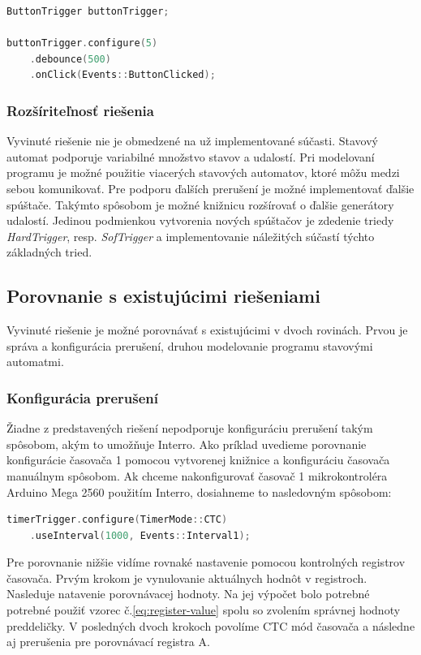\begin{lstlisting}[language=c++]         
ButtonTrigger buttonTrigger; 

buttonTrigger.configure(5)
    .debounce(500)
    .onClick(Events::ButtonClicked);
\end{lstlisting}

\subsubsection{Rozšíriteľnosť riešenia}
\noindent \par
Vyvinuté riešenie nie je obmedzené na už implementované súčasti. Stavový automat podporuje variabilné množstvo stavov a udalostí. Pri modelovaní programu je možné použitie
viacerých stavových automatov, ktoré môžu medzi sebou komunikovať. Pre podporu ďalších prerušení
je možné implementovať ďalšie spúštače. Takýmto spôsobom je možné knižnicu rozšírovať o ďalšie generátory udalostí. Jedinou podmienkou vytvorenia nových spúštačov je
zdedenie triedy \textit{HardTrigger}, resp. \textit{SofTrigger} a implementovanie náležitých súčastí týchto základných tried.

\subsection{Porovnanie s existujúcimi riešeniami}
\noindent \par
Vyvinuté riešenie je možné porovnávať s existujúcimi v dvoch rovinách. Prvou je správa a konfigurácia prerušení, druhou modelovanie programu stavovými automatmi.

\subsubsection{Konfigurácia prerušení}
\noindent \par
Žiadne z predstavených riešení nepodporuje konfiguráciu prerušení takým spôsobom, akým to umožňuje Interro. Ako príklad uvedieme porovnanie konfigurácie časovača 1 pomocou vytvorenej
knižnice a konfiguráciu časovača manuálnym spôsobom. Ak chceme nakonfigurovať časovač 1 mikrokontroléra Arduino Mega 2560 použitím Interro, dosiahneme to nasledovným spôsobom:

\begin{lstlisting}[language=c++]      
timerTrigger.configure(TimerMode::CTC)
    .useInterval(1000, Events::Interval1);
\end{lstlisting}

Pre porovnanie nižšie vidíme rovnaké nastavenie pomocou kontrolných registrov časovača. Prvým krokom je vynulovanie aktuálnych hodnôt v registroch.
Nasleduje natavenie porovnávacej hodnoty. Na jej výpočet bolo potrebné potrebné použiť vzorec č.\ref{eq:register-value} spolu so zvolením správnej hodnoty
preddeličky. V posledných dvoch krokoch povolíme CTC mód časovača a následne aj prerušenia pre porovnávací registra A.

